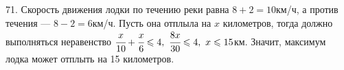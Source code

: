 71. Скорость движения лодки по течению реки равна $8+2=10$км/ч, а против течения --- $8-2=6$км/ч. Пусть она отплыла на $x$ километров, тогда должно выполняться неравенство $\cfrac{x}{10}+\cfrac{x}{6}\leqslant4,\ \cfrac{8x}{30}\leqslant4,\ x\leqslant15$км. Значит, максимум лодка может отплыть на 15 километров.\\
